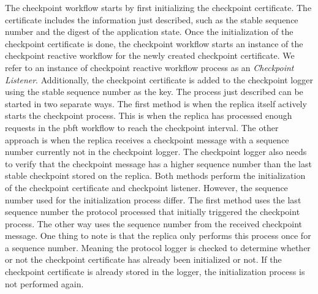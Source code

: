 The checkpoint workflow starts by first initializing the checkpoint certificate. The certificate includes the information just described, such as the stable sequence number and the digest of the application state. Once the initialization of the checkpoint certificate is done, the checkpoint workflow starts an instance of the checkpoint reactive workflow for the newly created checkpoint certificate. 
We refer to an instance of checkpoint reactive workflow process as an \emph{Checkpoint Listener}. Additionally, the checkpoint certificate is added to the checkpoint logger using the stable sequence number as the key. The process just described can be started in two separate ways. The first method is when the replica itself actively starts the checkpoint process. This is when the replica has processed enough requests in the \ac{pbft} workflow to reach the checkpoint interval. The other approach is when the replica receives a checkpoint message with a sequence number currently not in the checkpoint logger. The checkpoint logger also needs to verify that the checkpoint message has a higher sequence number than the last stable checkpoint stored on the replica. Both methods perform the initialization of the checkpoint certificate and checkpoint listener. However,  the sequence number used for the initialization process differ. The first method uses the last sequence number the protocol processed that initially triggered the checkpoint process. The other way uses the sequence number from the received checkpoint message.  One thing to note is that the replica only performs this process once for a sequence number. Meaning the protocol logger is checked to determine whether or not the checkpoint certificate has already been initialized or not. If the checkpoint certificate is already stored in the logger, the initialization process is not performed again.

